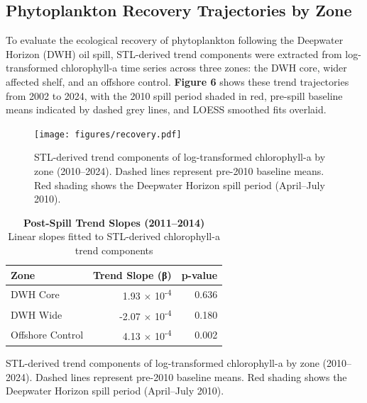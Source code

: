 \documentclass[
  11pt,
]{article}
\begin{document}
\subsection{Phytoplankton Recovery Trajectories by
Zone}\label{phytoplankton-recovery-trajectories-by-zone}

To evaluate the ecological recovery of phytoplankton following the
Deepwater Horizon (DWH) oil spill, STL-derived trend components were
extracted from log-transformed chlorophyll-a time series across three
zones: the DWH core, wider affected shelf, and an offshore control.
\textbf{Figure 6} shows these trend trajectories from 2002 to 2024, with
the 2010 spill period shaded in red, pre-spill baseline means indicated
by dashed grey lines, and LOESS smoothed fits overlaid.

\begin{figure}[H]

{\centering \texttt{[image: figures/recovery.pdf]}

}

\caption{STL-derived trend components of log-transformed chlorophyll-a
by zone (2010--2024). Dashed lines represent pre-2010 baseline means.
Red shading shows the Deepwater Horizon spill period (April--July
2010).}

\end{figure}%

\begin{table}
\caption*{
{\large \textbf{Post-Spill Trend Slopes (2011--2014)}} \\ 
{\small Linear slopes fitted to STL-derived chlorophyll-a trend components}
} 
\fontsize{9.0pt}{10.8pt}\selectfont
\begin{tabular*}{\linewidth}{@{\extracolsep{\fill}}lrr}
\toprule
Zone & Trend Slope (β) & p-value \\ 
\midrule\addlinespace[2.5pt]
DWH Core & 1.93 $\times$ 10\textsuperscript{-4} & 0.636 \\ 
DWH Wide & -2.07 $\times$ 10\textsuperscript{-4} & 0.180 \\ 
Offshore Control & 4.13 $\times$ 10\textsuperscript{-4} & 0.002 \\ 
\bottomrule
\end{tabular*}
\end{table}

STL-derived trend components of log-transformed chlorophyll-a by zone
(2010--2024). Dashed lines represent pre-2010 baseline means. Red
shading shows the Deepwater Horizon spill period (April--July 2010).
\end{document}
